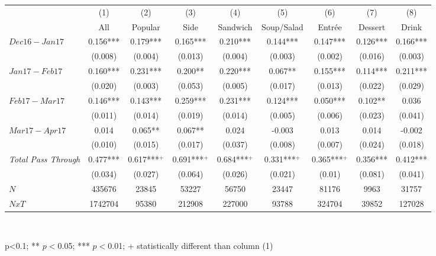 \begin{center}
\begin{tabular}{lcccccccc}
\hline  & (1) & (2) & (3) & (4) & (5) & (6) & (7) & (8)\\
 & All & Popular & Side & Sandwich & Soup/Salad & Entrée & Dessert & Drink\\
\hline  $ Dec16-Jan17 $  & 0.156*** & 0.179*** & 0.165*** & 0.210*** & 0.144*** & 0.147*** & 0.126*** & 0.166***\\
 & (0.008) & (0.004) & (0.013) & (0.004) & (0.003) & (0.002) & (0.016) & (0.003)\\
 $ Jan17-Feb17 $  & 0.160*** & 0.231*** & 0.200** & 0.220*** & 0.067** & 0.155*** & 0.114*** & 0.211***\\
 & (0.020) & (0.003) & (0.053) & (0.005) & (0.017) & (0.013) & (0.022) & (0.029)\\
 $ Feb17-Mar17 $  & 0.146*** & 0.143*** & 0.259*** & 0.231*** & 0.124*** & 0.050*** & 0.102** & 0.036\\
 & (0.011) & (0.014) & (0.019) & (0.014) & (0.005) & (0.006) & (0.023) & (0.041)\\
 $ Mar17-Apr17 $  & 0.014 & 0.065** & 0.067** & 0.024 & -0.003 & 0.013 & 0.014 & -0.002\\
 & (0.010) & (0.015) & (0.017) & (0.037) & (0.008) & (0.007) & (0.024) & (0.018)\\
\hline \textit{Total Pass Through} & 0.477*** & 0.617***$^+$ & 0.691***$^+$ & 0.684***$^+$ & 0.331***$^+$ & 0.365***$^+$ & 0.356*** & 0.412***\\
  & (0.034) & (0.027) & (0.064) & (0.026) & (0.021) & (0.01) & (0.081) & (0.041)\\
\hline  $ N $  & 435676 & 23845 & 53227 & 56750 & 23447 & 81176 & 9963 & 31757\\
 $ NxT $  & 1742704 & 95380 & 212908 & 227000 & 93788 & 324704 & 39852 & 127028\\
\hline\end{tabular}\\
\begin{tiny}p<0.1; ** $p<0$.05; *** $p<0$.01; + statistically different than column (1)\end{tiny}\\
\end{center}
